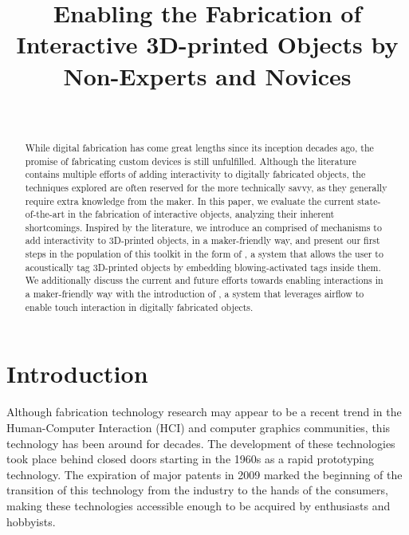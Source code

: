 


  \title{Enabling the Fabrication of Interactive 3D-printed Objects by
    Non-Experts and Novices}
  \author{%
    \\
  }

  \maketitle

  \begin{abstract}
    While digital fabrication has come great lengths since its inception
    decades ago, the promise of fabricating custom devices is still
    unfulfilled. Although the literature contains multiple efforts of adding
    interactivity to digitally fabricated objects, the techniques explored are
    often reserved for the more technically savvy, as they generally require
    extra knowledge from the maker. In this paper, we evaluate the current
    state-of-the-art in the fabrication of interactive objects, analyzing their
    inherent shortcomings. Inspired by the literature, we introduce an
    \itoolkit comprised of mechanisms to add interactivity to 3D-printed
    objects, in a maker-friendly way, and present our first steps in the
    population of this toolkit in the form of \bh, a system that allows the
    user to acoustically tag 3D-printed objects by embedding blowing-activated
    tags inside them.  We additionally discuss the current and future efforts
    towards enabling interactions in a maker-friendly way with the introduction
    of \at, a system that leverages airflow to enable touch interaction in
    digitally fabricated objects.
  \end{abstract}

  \section{Introduction}
    Although fabrication technology research may appear to be a recent trend in
    the Human-Computer Interaction (HCI) and computer graphics communities,
    this technology has been around for decades. The development of these
    technologies took place behind closed doors starting in the 1960s as a
    rapid prototyping technology. The expiration of major patents in 2009
    marked the beginning of the transition of this technology from the industry
    to the hands of the consumers, making these technologies accessible enough
    to be acquired by enthusiasts and hobbyists.

